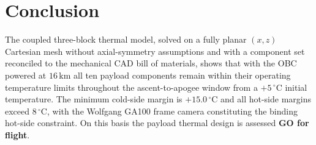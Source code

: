 \documentclass[11pt,a4paper]{article}
\newcommand{\degC}{\,^{\circ}\mathrm{C}}
\newcommand{\unit}[1]{\,\mathrm{#1}}
\begin{document}
\section{Conclusion}
The coupled three-block thermal model, solved on a fully planar $(x,z)$ Cartesian
mesh without axial-symmetry assumptions and with a component set reconciled to the
mechanical CAD bill of materials, shows that with the OBC powered at $16\unit{km}$
all ten payload components remain within their operating temperature limits throughout
the ascent-to-apogee window from a $+5\degC$ initial temperature. The minimum
cold-side margin is $+15.0\degC$ and all hot-side margins exceed $8\degC$, with the
Wolfgang GA100 frame camera constituting the binding hot-side constraint. On this
basis the payload thermal design is assessed \textbf{GO for flight}.
\end{document}
